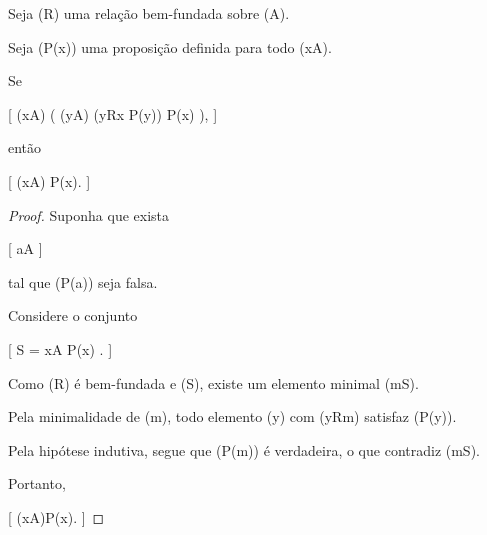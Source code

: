 \documentclass[../../main]{subfiles}
\begin{document}








\begin{prop}
	\label{prop:matematica:relacoes:inducao-bem-fundada}

	Seja (R) uma relação bem-fundada sobre (A).

	Seja (P(x)) uma proposição definida para todo (x\in A).

	Se

		[
			(\forall x\in A)
			\Bigl(
			(\forall y\in A)
			(yRx \Rightarrow P(y))
			\Rightarrow
			P(x)
			\Bigr),
		]

	então

	[
	(\forall x\in A)
	P(x).
	]

\end{prop}

\begin{proof}

	Suponha que exista

		[
			a\in A
		]

	tal que (P(a)) seja falsa.

	Considere o conjunto

		[
			S
				=
				{
					x\in A
					\mid
					\neg P(x)
				}.
		]

	Como (R) é bem-fundada e (S\neq\varnothing), existe um elemento
	minimal (m\in S).

	Pela minimalidade de (m), todo elemento (y) com (yRm) satisfaz
	(P(y)).

	Pela hipótese indutiva, segue que (P(m)) é verdadeira, o que
	contradiz (m\in S).

	Portanto,

	[
			(\forall x\in A)P(x).
		]

\end{proof}
\end{document}
